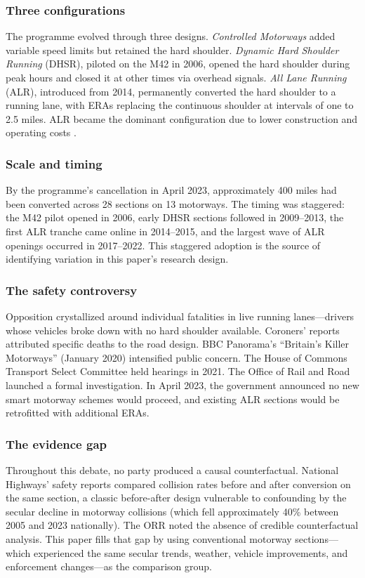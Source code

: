 \documentclass[12pt]{article}
\begin{document}
\subsubsection*{Three configurations} The programme evolved through three designs. \textit{Controlled Motorways} added variable speed limits but retained the hard shoulder. \textit{Dynamic Hard Shoulder Running} (DHSR), piloted on the M42 in 2006, opened the hard shoulder during peak hours and closed it at other times via overhead signals. \textit{All Lane Running} (ALR), introduced from 2014, permanently converted the hard shoulder to a running lane, with ERAs replacing the continuous shoulder at intervals of one to 2.5 miles. ALR became the dominant configuration due to lower construction and operating costs \citep{national_highways_2023}.

\subsubsection*{Scale and timing} By the programme's cancellation in April 2023, approximately 400 miles had been converted across 28 sections on 13 motorways. The timing was staggered: the M42 pilot opened in 2006, early DHSR sections followed in 2009--2013, the first ALR tranche came online in 2014--2015, and the largest wave of ALR openings occurred in 2017--2022. This staggered adoption is the source of identifying variation in this paper's research design.

\subsubsection*{The safety controversy} Opposition crystallized around individual fatalities in live running lanes---drivers whose vehicles broke down with no hard shoulder available. Coroners' reports attributed specific deaths to the road design. BBC Panorama's ``Britain's Killer Motorways'' (January 2020) intensified public concern. The House of Commons Transport Select Committee held hearings in 2021. The Office of Rail and Road launched a formal investigation. In April 2023, the government announced no new smart motorway schemes would proceed, and existing ALR sections would be retrofitted with additional ERAs.

\subsubsection*{The evidence gap} Throughout this debate, no party produced a causal counterfactual. National Highways' safety reports compared collision rates before and after conversion on the same section, a classic before-after design vulnerable to confounding by the secular decline in motorway collisions (which fell approximately 40\% between 2005 and 2023 nationally). The ORR noted the absence of credible counterfactual analysis. This paper fills that gap by using conventional motorway sections---which experienced the same secular trends, weather, vehicle improvements, and enforcement changes---as the comparison group.
\end{document}
